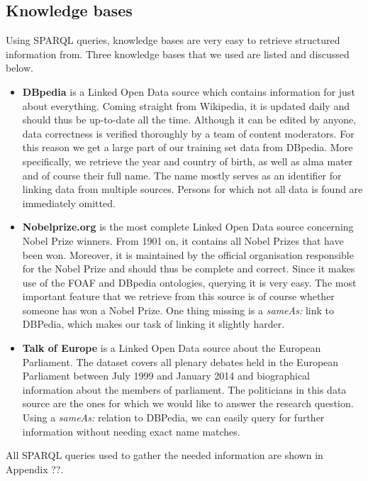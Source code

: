 \subsection{Knowledge bases}
\label{ssec:knowledgebases}

Using SPARQL queries, knowledge bases are very easy to retrieve structured information from. Three knowledge bases that we used are listed and discussed below.

\begin{itemize}
\item{\textbf{DBpedia}} is a Linked Open Data source which contains information for just about everything. Coming straight from Wikipedia, it is updated daily and should thus be up-to-date all the time. Although it can be edited by anyone, data correctness is verified thoroughly by a team of content moderators. For this reason we get a large part of our training set data from DBpedia. More specifically, we retrieve the year and country of birth, as well as alma mater and of course their full name. The name mostly serves as an identifier for linking data from multiple sources. Persons for which not all data is found are immediately omitted.

\item{\textbf{Nobelprize.org}} is the most complete Linked Open Data source concerning Nobel Prize winners. From 1901 on, it contains all Nobel Prizes that have been won. Moreover, it is maintained by the official organisation responsible for the Nobel Prize and should thus be complete and correct. Since it makes use of the FOAF and DBpedia ontologies, querying it is very easy. The most important feature that we retrieve from this source is of course whether someone has won a Nobel Prize. One thing missing is a \emph{sameAs:} link to DBPedia, which makes our task of linking it slightly harder. 

\item{\textbf{Talk of Europe}} is a Linked Open Data source about the European Parliament. The dataset covers all plenary debates held in the European Parliament between July 1999 and January 2014 and biographical information about the members of parliament. The politicians in this data source are the ones for which we would like to answer the research question. Using a \emph{sameAs:} relation to DBPedia, we can easily query for further information without needing exact name matches.
\end{itemize}

\noindent All SPARQL queries used to gather the needed information are shown in Appendix ??.

